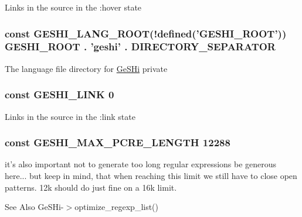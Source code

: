 Links in the source in the \-:hover state \hypertarget{geshi_8php_a9771b008486bce86bfb0f9e943d2e5dc}{
\subsubsection[{G\-E\-S\-H\-I\-\_\-\-L\-A\-N\-G\-\_\-\-R\-O\-O\-T}]{\setlength{\rightskip}{0pt plus 5cm}const G\-E\-S\-H\-I\-\_\-\-L\-A\-N\-G\-\_\-\-R\-O\-O\-T(!defined('G\-E\-S\-H\-I\-\_\-\-R\-O\-O\-T')) G\-E\-S\-H\-I\-\_\-\-R\-O\-O\-T . 'geshi' . D\-I\-R\-E\-C\-T\-O\-R\-Y\-\_\-\-S\-E\-P\-A\-R\-A\-T\-O\-R}}\label{geshi_8php_a9771b008486bce86bfb0f9e943d2e5dc}
The language file directory for \hyperlink{class_ge_s_hi}{Ge\-S\-Hi}  private \hypertarget{geshi_8php_a331e5dc0cf2a33efd061f37c52a8f1b1}{
\subsubsection[{G\-E\-S\-H\-I\-\_\-\-L\-I\-N\-K}]{\setlength{\rightskip}{0pt plus 5cm}const G\-E\-S\-H\-I\-\_\-\-L\-I\-N\-K 0}}\label{geshi_8php_a331e5dc0cf2a33efd061f37c52a8f1b1}
Links in the source in the \-:link state \hypertarget{geshi_8php_aed8e5439df210544cf31a28d2c2e9e77}{
\subsubsection[{G\-E\-S\-H\-I\-\_\-\-M\-A\-X\-\_\-\-P\-C\-R\-E\-\_\-\-L\-E\-N\-G\-T\-H}]{\setlength{\rightskip}{0pt plus 5cm}const G\-E\-S\-H\-I\-\_\-\-M\-A\-X\-\_\-\-P\-C\-R\-E\-\_\-\-L\-E\-N\-G\-T\-H 12288}}\label{geshi_8php_aed8e5439df210544cf31a28d2c2e9e77}
it's also important not to generate too long regular expressions be generous here... but keep in mind, that when reaching this limit we still have to close open patterns. 12k should do just fine on a 16k limit. \begin{DoxySeeAlso}{See Also}
Ge\-S\-Hi-\/$>$optimize\-\_\-regexp\-\_\-list() 
\end{DoxySeeAlso}
